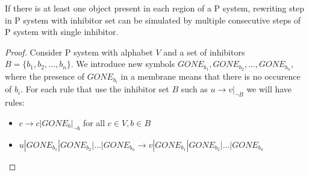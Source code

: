 \begin{lemma}
\label{lemma:inhibitor_step}
  If there is at least one object present in each region of a P system, rewriting step in P system with inhibitor set can be simulated by multiple consecutive steps of P system with single inhibitor.
\end{lemma}

\begin{proof}
  Consider P system with alphabet $V$ and a set of inhibitors $B=\{b_1, b_2, \dots ,b_n\}$.
  We introduce new symbols $GONE_{b_1}, GONE_{b_2}, \dots , GONE_{b_n}$, where the presence of $GONE_{b_i}$ in a membrane means that there is no occurence of $b_i$.
  For each rule that use the inhibitor set $B$ such as $u\rightarrow v|_{\neg B}$ we will have rules:
  \begin{itemize}
    \item $c \rightarrow c|GONE_{b}|_{\neg b}$ for all $ c\in V, b\in B$
    \item $u|GONE_{b_1}|GONE_{b_2}|\dots|GONE_{b_n} \rightarrow v|GONE_{b_1}|GONE_{b_2}|\dots|GONE_{b_n}$
  \end{itemize}
\end{proof}
